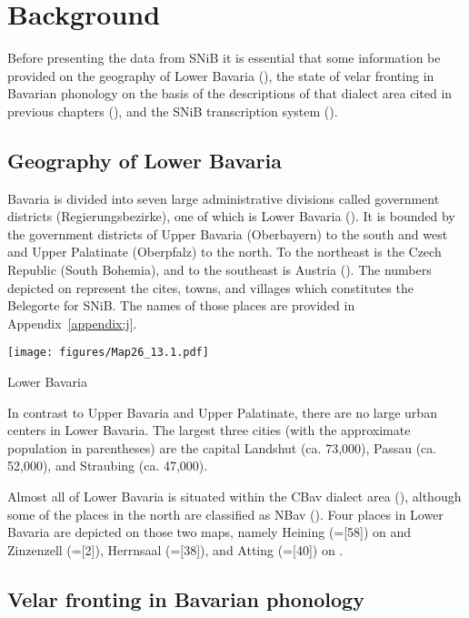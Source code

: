 \section{Background}\label{sec:13.2}

Before presenting the data from SNiB it is essential that some information be provided on the geography of Lower Bavaria (), the state of velar fronting in Bavarian phonology on the basis of the descriptions of that dialect area cited in previous chapters (), and the SNiB transcription system ().

\subsection{Geography of Lower Bavaria}\label{sec:13.2.1}

Bavaria is divided into seven large administrative divisions called government districts (Regierungsbezirke), one of which is Lower Bavaria (). It is bounded by the government districts of Upper Bavaria (Oberbayern) to the south and west and Upper Palatinate (Oberpfalz) to the north. To the northeast is the Czech Republic (South Bohemia), and to the southeast is Austria (). The numbers depicted on  represent the cites, towns, and villages which constitutes the Belegorte for SNiB. The names of those places are provided in Appendix~\ref{appendix:j}.


\begin{map}
\texttt{[image: figures/Map26\_13.1.pdf]}
\caption{Lower Bavaria}\label{map:26}
\end{map}

In contrast to Upper Bavaria and Upper Palatinate, there are no large urban centers in Lower Bavaria.  The largest three cities (with the approximate population in parentheses) are the capital Landshut (ca. 73,000), Passau (ca. 52,000), and Straubing (ca. 47,000).

Almost all of Lower Bavaria is situated within the CBav dialect area (), although some of the places in the north are classified as NBav (). Four places in Lower Bavaria are depicted on those two maps, namely Heining (=[58]) on  and Zinzenzell (=[2]), Herrnsaal (=[38]), and Atting (=[40]) on .

\subsection{Velar fronting in Bavarian phonology}\label{sec:13.2.2}

